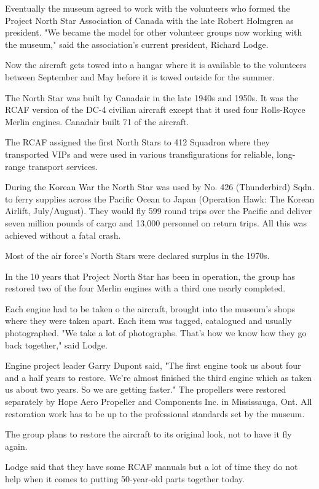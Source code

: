 Eventually the museum agreed to work with the volunteers who formed
the Project North Star Association of Canada with the late Robert
Holmgren as president. "We became the model for other volunteer groups
now working with the museum," said the association's current
president, Richard Lodge.

Now the aircraft gets towed into a hangar where it is available to the
volunteers between September and May before it is towed outside for
the summer.

The North Star was built by Canadair in the late 1940s and 1950s. It
was the RCAF version of the DC-4 civilian aircraft except that it used
four Rolls-Royce Merlin engines. Canadair built 71 of the aircraft.

The RCAF assigned the first North Stars to 412 Squadron where they
transported VIPs and were used in various transfigurations for
reliable, long-range transport services.

During the Korean War the North Star was used by No. 426 (Thunderbird)
Sqdn. to ferry supplies across the Pacific Ocean to Japan (Operation
Hawk: The Korean Airlift, July/August). They would fly 599 round trips
over the Pacific and deliver seven million pounds of cargo and 13,000
personnel on return trips. All this was achieved without a fatal
crash.

Most of the air force's North Stars were declared surplus in the
1970s.

In the 10 years that Project North Star has been in operation, the
group has restored two of the four Merlin engines with a third one
nearly completed.

Each engine had to be taken o the aircraft, brought into the museum's
shops where they were taken apart. Each item was tagged, catalogued 
and usually photographed. "We take a lot of photographs. That's
how we know how they go back together," said Lodge.

Engine project leader Garry Dupont said, "The first engine took us about
four and a half years to restore. We're almost finished the third engine
which as taken us about two years. So we are getting faster." The
propellers were restored separately by Hope Aero Propeller and
Components Inc. in Mississauga, Ont. All restoration work has to be up
to the professional standards set by the museum.

The group plans to restore the aircraft to its original look, not to
have it fly again.

Lodge said that they have some RCAF manuals but a lot of time they do
not help when it comes to putting 50-year-old parts together today.

